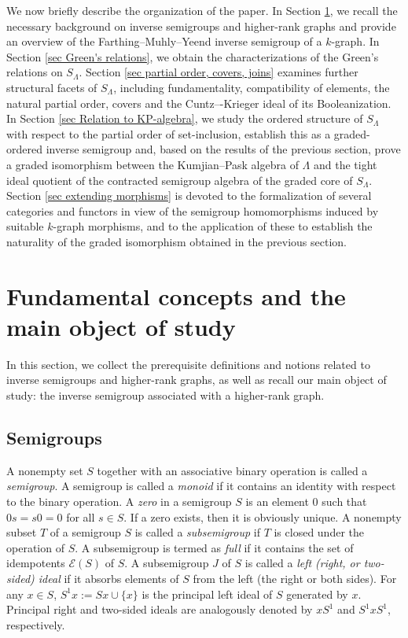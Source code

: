 \documentclass[a4paper,reqno,11pt]{amsart}
\numberwithin{equation}{section}
\theoremstyle{definition}
\theoremstyle{remark}
\begin{document}
We now briefly describe the organization of the paper. In Section \ref{sec prelim}, we recall the necessary background on inverse semigroups and higher-rank graphs and provide an overview of the Farthing--Muhly--Yeend inverse semigroup of a $k$-graph. In Section \ref{sec Green's relations}, we obtain the characterizations of the Green's relations on $S_\Lambda$. Section \ref{sec partial order, covers, joins} examines further structural facets of $S_\Lambda$, including fundamentality, compatibility of elements, the natural partial order, covers and the Cuntz–-Krieger ideal of its Booleanization. In Section \ref{sec Relation to KP-algebra}, we study the ordered structure of $S_\Lambda$ with respect to the partial order of set-inclusion, establish this as a graded-ordered inverse semigroup and, based on the results of the previous section, prove a graded isomorphism between the Kumjian--Pask algebra of $\Lambda$ and the tight ideal quotient of the contracted semigroup algebra of the graded core of $S_\Lambda$. Section \ref{sec extending morphisms} is devoted to the formalization of several categories and functors in view of the semigroup homomorphisms induced by suitable $k$-graph morphisms, and to the application of these to establish the naturality of the graded isomorphism obtained in the previous section.   

\section{Fundamental concepts and the main object of study}\label{sec prelim}
In this section, we collect the prerequisite definitions and notions related to inverse semigroups and higher-rank graphs, as well as recall our main object of study: the inverse semigroup associated with a higher-rank graph.  

\subsection{Semigroups}\label{ssec semigroups} 
A nonempty set $S$ together with an associative binary operation is called a \emph{semigroup}. A semigroup is called a \emph{monoid} if it contains an identity with respect to the binary operation. A \emph{zero} in a semigroup $S$ is an element $0$ such that $0s=s0=0$ for all $s\in S$. If a zero exists, then it is obviously unique. A nonempty subset $T$ of a semigroup $S$ is called a \emph{subsemigroup} if $T$ is closed under the operation of $S$. A subsemigroup is termed as \emph{full} if it contains the set of idempotents $\mathcal{E}(S)$ of $S$. A subsemigroup $J$ of $S$ is called a \emph{left (right, or two-sided) ideal} if it absorbs elements of $S$ from the left (the right or both sides). For any $x\in S$, $S^1 x:=Sx\cup \{x\}$ is the principal left ideal of $S$ generated by $x$. Principal right and two-sided ideals are analogously denoted by $xS^1$ and $S^1 x S^1$, respectively.
\end{document}
